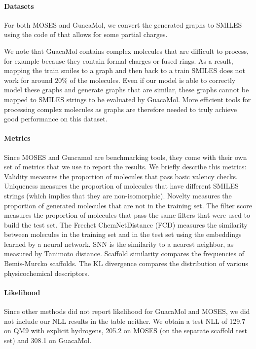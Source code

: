 \documentclass{article} %
\theoremstyle{plain}
\theoremstyle{definition}
\theoremstyle{remark}
\begin{document}
\paragraph{Datasets}

For both MOSES and GuacaMol, we convert the generated graphs to SMILES using the code of \citet{jo2022score} that allows for some partial charges.

We note that GuacaMol contains complex molecules that are difficult to process, for example because they contain formal charges or fused rings. As a result, mapping the train smiles to a graph and then back to a train SMILES does not work for around $20\%$ of the molecules. 
Even if our model is able to correctly model these graphs and generate graphs that are similar, these graphs cannot be mapped to SMILES strings to be evaluated by GuacaMol.
More efficient tools for processing complex molecules as graphs are therefore needed to truly achieve good performance on this dataset.



\paragraph{Metrics}

Since MOSES and Guacamol are benchmarking tools, they come with their own set of metrics that we use to report the results. We briefly describe this metrics:
Validity measures the proportion of molecules that pass basic valency checks. Uniqueness measures the proportion of molecules that have different SMILES strings (which implies that they are non-isomorphic). Novelty measures the proportion of generated molecules that are not in the training set. The filter score measures the proportion of molecules that pass the same filters that were used to build the test set. The Frechet ChemNetDistance (FCD) measures the similarity between molecules in the training set and in the test set using the embeddings learned by a neural network. SNN is the similarity to a nearest neighbor, as measured by Tanimoto distance. Scaffold similarity compares the frequencies of Bemis-Murcko scaffolds. The KL divergence compares the distribution of various physicochemical descriptors.

\paragraph{Likelihood} Since other methods did not report likelihood for GuacaMol and MOSES, we did not include our NLL results in the table neither. We obtain a test NLL of 129.7 on QM9 with explicit hydrogens, 205.2 on MOSES (on the separate scaffold test set) and 308.1 on GuacaMol.
\end{document}
